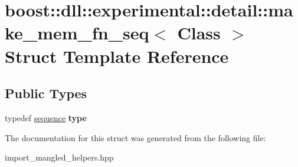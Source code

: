 \hypertarget{a01500}{}\section{boost\+:\+:dll\+:\+:experimental\+:\+:detail\+:\+:make\+\_\+mem\+\_\+fn\+\_\+seq$<$ Class $>$ Struct Template Reference}
\label{a01500}
\subsection*{Public Types}
\begin{DoxyCompactItemize}
\item 
\mbox{\label{a01500_a893e92107588ac688d209099dda34d20}} 
typedef \hyperlink{a01432}{sequence} {\bfseries type}
\end{DoxyCompactItemize}


The documentation for this struct was generated from the following file\+:\begin{DoxyCompactItemize}
\item 
import\+\_\+mangled\+\_\+helpers.\+hpp\end{DoxyCompactItemize}
